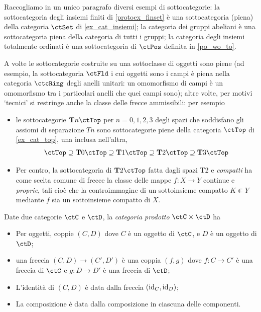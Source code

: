 \begin{example}
 Raccogliamo in un unico paragrafo diversi esempi di sottocategorie: la sottocategoria degli insiemi finiti di \ref{protoex_finset} è una sottocategoria (piena) della categoria \(\ctSet\) di \ref{ex_cat_insiemi}; la categoria dei gruppi abeliani è una sottocategoria piena della categoria di tutti i gruppi; la categoria degli insiemi totalmente ordinati è una sottocategoria di \(\ctPos\) definita in \ref{po_wo_to}.

 A volte le sottocategorie costruite su una sottoclasse di oggetti sono piene (ad esempio, la sottocategoria \(\ctFld\) i cui oggetti sono i campi è piena nella categoria \(\ctcRing\) degli anelli unitari: un omomorfismo di campi è un omomorfismo tra i particolari anelli che quei campi sono); altre volte, per motivi `tecnici' si restringe anche la classe delle frecce ammissibili: per esempio
 \begin{itemize}
  \item le sottocategorie \(\cate{T}n\ctTop\) per \(n=0,1,2,3\) degli spazi che soddisfano gli assiomi di separazione \(Tn\) sono sottocategorie piene della categoria \(\ctTop\) di \ref{ex_cat_top}, una inclusa nell'altra,
        \[\ctTop\supseteq\cate{T}0\ctTop\supseteq\cate{T}1\ctTop\supseteq\cate{T}2\ctTop\supseteq\cate{T}3\ctTop\]
  \item Per contro, la sottocategoria di \(\cate{T}2\ctTop\) fatta dagli spazi T2 e \emph{compatti} ha come scelta comune di frecce la classe delle mappe \(f \colon X\to Y\) continue e \emph{proprie}, tali cioè che la controimmagine di un sottoinsieme compatto \(K\Subset Y\) mediante \(f\) sia un sottoinsieme compatto di \(X\).
 \end{itemize}
\end{example}
\begin{definition}\label{def_cat_prodotto}
 Date due categorie \(\ctC\) e \(\ctD\), la \emph{categoria prodotto} \(\ctC\times\ctD\) ha
 \begin{itemize}
  \item Per oggetti, coppie \((C,D)\) dove \(C\) è un oggetto di \(\ctC\), e \(D\) è un oggetto di \(\ctD\);
  \item una freccia \((C,D)\to(C',D')\) è una coppia \((f,g)\) dove \(f\colon C\to C'\) è una freccia di \(\ctC\) e \(g\colon D\to D'\) è una freccia di \(\ctD\);
  \item L'identità di \((C,D)\) è data dalla freccia \((\mathrm{id}_C,\mathrm{id}_D)\);
  \item La composizione è data dalla composizione in ciascuna delle componenti.
 \end{itemize}
\end{definition}

